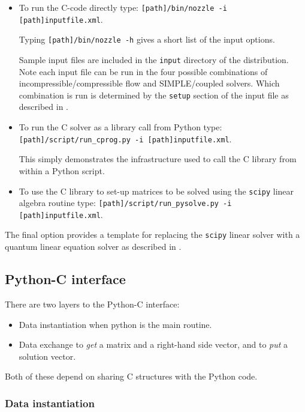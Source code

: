\begin{itemize}
\item To run the C-code directly type: {\tt [path]/bin/nozzle -i [path]inputfile.xml}.

      Typing {\tt [path]/bin/nozzle -h} gives a short list of the input options.

      Sample input files are included in the {\tt input} directory of the distribution.
      Note each input file can be run in the four possible combinations of incompressible/compressible flow and
      SIMPLE/coupled solvers. Which combination is run is determined by the {\tt setup} section of the
      input file as described in .

\item To run the C solver as a library call from Python type: {\tt [path]/script/run\_cprog.py -i [path]inputfile.xml}.

      This simply demonstrates the infrastructure used to call the C library from within a Python script.

\item To use the C library to set-up matrices to be solved using the {\tt scipy} linear algebra routine type:
      {\tt [path]/script/run\_pysolve.py -i [path]inputfile.xml}.  
\end{itemize}

The final option provides a template for replacing the {\tt scipy} linear solver with a quantum linear equation solver
as described in .


%
\subsection{Python-C interface}
\label{subsec-py2c}
There are two layers to the Python-C interface:
\begin{itemize}
  \item Data instantiation when python is the main routine.
  \item Data exchange to {\it get} a matrix and a right-hand side vector, 
        and to {\it put} a solution vector.
\end{itemize}

Both of these depend on sharing C structures with the Python code.


%
\subsubsection{Data instantiation}
\label{subsubsec-data-inst}


